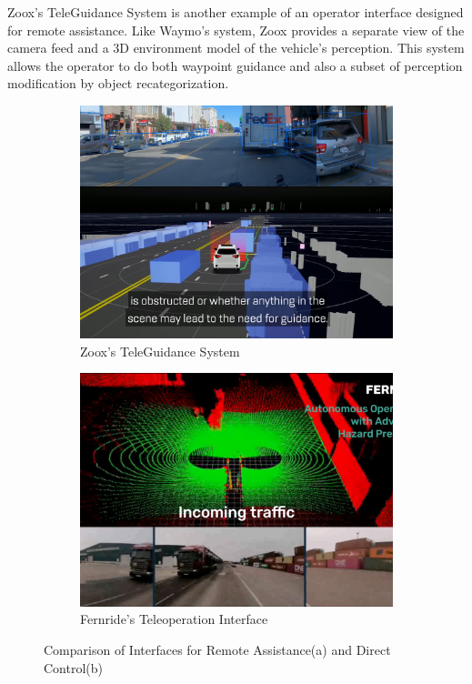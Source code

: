 Zoox's TeleGuidance System \cite{zoox2024teleguidance} is another example of an operator interface designed for remote assistance. Like Waymo’s system, Zoox provides a separate view of the camera feed and a 3D environment model of the vehicle’s perception. This system allows the operator to do both waypoint guidance
 \cite{corridor} and also a subset of perception modification \cite{Feiler2021ThePM} by object recategorization.

\begin{figure}
    \centering
    \begin{subfigure}[b]{0.48\textwidth}
        \centering
        \includegraphics[width=1\textwidth]{figures/zoox.png}
        \caption{Zoox's TeleGuidance System}
        \label{fig:Zoox}
    \end{subfigure}
    \hfill
    \begin{subfigure}[b]{0.48\textwidth}
        \centering
        \includegraphics[width=1\textwidth]{figures/fernride.png}
        \caption{Fernride's Teleoperation Interface}
        \label{fig:Fernride}
    \end{subfigure}
    \caption{Comparison of Interfaces for Remote Assistance(a) and Direct Control(b)}
    \label{fig:TeleoperationComparison}
\end{figure}

